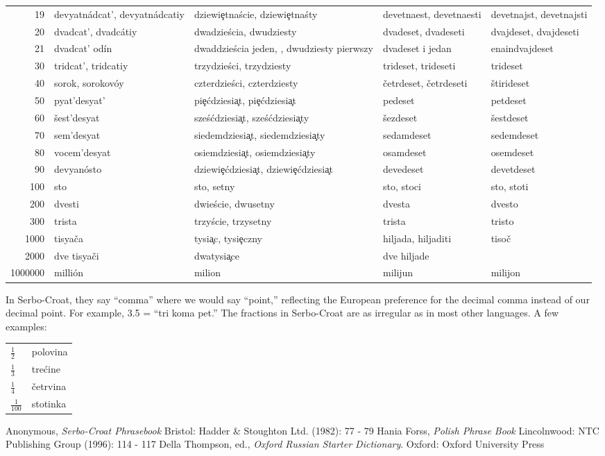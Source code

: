 \documentclass[12pt]{article}
\begin{document}
\begin{tabular}{|r|l|l|l|l|}
19 & devyatn\'adcat', devyatn\'adcatiy & dziewi\c{e}tna\'scie, dziewi\c{e}tna\'sty & devetnaest, devetnaesti & devetnajst, devetnajsti \\
20 & dvadcat', dvadc\'atiy & dwadzie\'scia, dwudziesty & dvadeset, dvadeseti & dvajdeset, dvajdeseti \\
21 & dvadcat' od\'in & dwaddzie\'scia jeden, , dwudziesty pierwszy & dvadeset i jedan & enaindvajdeset \\
30 & tridcat', tridcatiy & trzydzie\'sci, trzydziesty & trideset, trideseti & trideset \\
40 & sorok, sorokov\'oy & czterdzie\'sci, czterdziesty & \v{c}etrdeset, \v{c}etrdeseti & \v{s}tirideset \\
50 & pyat'desyat' & pi\c{e}\'cdziesi\c{a}t, pi\c{e}\'cdziesi\c{a}t & pedeset & petdeset \\
60 & \v{s}est'desyat & sze\'s\'cdziesi\c{a}t, sze\'s\'cdziesi\c{a}ty & \v{s}ezdeset & \v{s}estdeset \\
70 & sem'desyat & siedemdziesi\c{a}t, siedemdziesi\c{a}ty & sedamdeset & sedemdeset \\
80 & vocem'desyat & osiemdziesi\c{a}t, osiemdziesi\c{a}ty & osamdeset & osemdeset \\
90 & devyan\'osto & dziewi\c{e}\'cdziesi\c{a}t, dziewi\c{e}\'cdziesi\c{a}t & devedeset & devetdeset \\
100 & sto & sto, setny & sto, stoci & sto, stoti \\
200 & dvesti & dwie\'scie, dwusetny & dvesta & dvesto \\
300 & trista & trzy\'scie, trzysetny & trista & tristo \\
1000 & tisya\v{c}a & tysi\c{a}c, tysi\c{e}czny & hiljada, hiljaditi & tiso\v{c} \\
2000 & dve tisya\v{c}i & dwatysi\c{a}ce & dve hiljade & \\
1000000 & milli\'on & milion & milijun & milijon \\
\end{tabular}

In Serbo-Croat, they say ``comma'' where we would say ``point,'' reflecting the European preference for the decimal comma instead of our decimal point. For example, 3.5 = ``tri koma pet.'' The fractions in Serbo-Croat are as irregular as in most other languages. A few examples:

\begin{tabular}{|l|l|}
$\frac{1}{2}$ & polovina \\
$\frac{1}{3}$ & tre\'cine \\
$\frac{1}{4}$ & \v{c}etrvina \\
$\frac{1}{100}$ & stotinka \\
\end{tabular}

\begin{thebibliography}{2}
 Anonymous, {\it Serbo-Croat Phrasebook} Bristol: Hadder \& Stoughton Ltd. (1982): 77 - 79
 Hania Forss, {\it Polish Phrase Book} Lincolnwood: NTC Publishing Group (1996): 114 - 117
 Della Thompson, ed., {\it Oxford Russian Starter Dictionary}. Oxford: Oxford University Press
\end{thebibliography}
\end{document}
